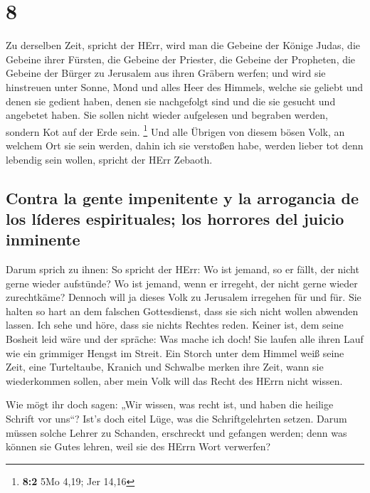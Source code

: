 \hypertarget{section-7}{%
\section{8}\label{section-7}}

 Zu derselben Zeit, spricht der HErr, wird man die Gebeine
der Könige Judas, die Gebeine ihrer Fürsten, die Gebeine der Priester,
die Gebeine der Propheten, die Gebeine der Bürger zu Jerusalem aus ihren
Gräbern werfen;  und wird sie hinstreuen unter Sonne, Mond
und alles Heer des Himmels, welche sie geliebt und denen sie gedient
haben, denen sie nachgefolgt sind und die sie gesucht und angebetet
haben. Sie sollen nicht wieder aufgelesen und begraben werden, sondern
Kot auf der Erde sein. \footnote{\textbf{8:2} 5Mo 4,19; Jer 14,16}
 Und alle Übrigen von diesem bösen Volk, an welchem Ort
sie sein werden, dahin ich sie verstoßen habe, werden lieber tot denn
lebendig sein wollen, spricht der HErr Zebaoth.

\hypertarget{contra-la-gente-impenitente-y-la-arrogancia-de-los-luxedderes-espirituales-los-horrores-del-juicio-inminente}{%
\subsection{Contra la gente impenitente y la arrogancia de los líderes
espirituales; los horrores del juicio
inminente}\label{contra-la-gente-impenitente-y-la-arrogancia-de-los-luxedderes-espirituales-los-horrores-del-juicio-inminente}}

 Darum sprich zu ihnen: So spricht der HErr: Wo ist
jemand, so er fällt, der nicht gerne wieder aufstünde? Wo ist jemand,
wenn er irregeht, der nicht gerne wieder zurechtkäme? 
Dennoch will ja dieses Volk zu Jerusalem irregehen für und für. Sie
halten so hart an dem falschen Gottesdienst, dass sie sich nicht wollen
abwenden lassen.  Ich sehe und höre, dass sie nichts
Rechtes reden. Keiner ist, dem seine Bosheit leid wäre und der spräche:
Was mache ich doch! Sie laufen alle ihren Lauf wie ein grimmiger Hengst
im Streit.  Ein Storch unter dem Himmel weiß seine Zeit,
eine Turteltaube, Kranich und Schwalbe merken ihre Zeit, wann sie
wiederkommen sollen, aber mein Volk will das Recht des HErrn nicht
wissen.

 Wie mögt ihr doch sagen: „Wir wissen, was recht ist, und
haben die heilige Schrift vor uns``? Ist's doch eitel Lüge, was die
Schriftgelehrten setzen.  Darum müssen solche Lehrer zu
Schanden, erschreckt und gefangen werden; denn was können sie Gutes
lehren, weil sie des HErrn Wort verwerfen?

